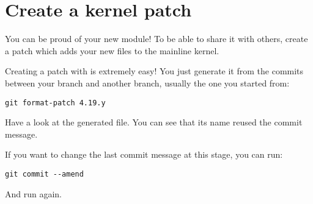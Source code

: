 \section{Create a kernel patch}

You can be proud of your new module! To be able to share it with
others, create a patch which adds your new files to the mainline
kernel.

Creating a patch with  is extremely easy! You just generate it
from the commits between your branch and another branch, usually the
one you started from:

\begin{verbatim}
git format-patch 4.19.y
\end{verbatim}

Have a look at the generated file. You can see that its name reused
the commit message.

If you want to change the last commit message at this stage, you
can run:

\begin{verbatim}
git commit --amend
\end{verbatim}

And run  again.
